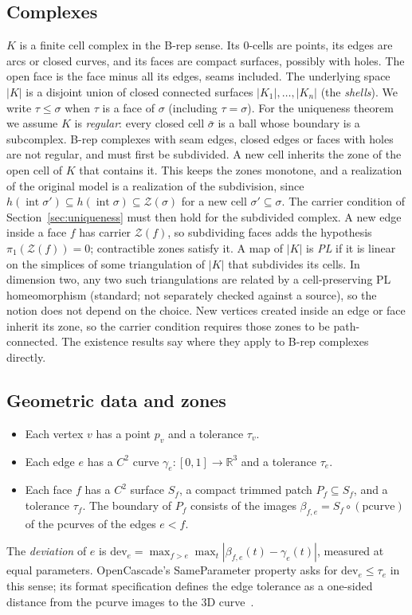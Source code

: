 \documentclass[preprint,12pt]{elsarticle}
\theoremstyle{definition}
\theoremstyle{remark}
\newcommand{\R}{\mathbb{R}}
\newcommand{\Z}{\mathcal{Z}}
\newcommand{\inter}{\operatorname{int}}
\begin{document}
\subsection{Complexes}
$K$ is a finite cell complex in the B-rep sense. Its 0-cells are points, its edges are arcs or closed curves, and
its faces are compact surfaces, possibly with holes. The open face is the face minus all its edges, seams included. The underlying space $|K|$ is a
disjoint union of closed connected surfaces $|K_1|,\dots,|K_n|$ (the \emph{shells}). We write $\tau\le\sigma$ when $\tau$ is a face of $\sigma$ (including
$\tau=\sigma$). For the uniqueness theorem we assume $K$ is \emph{regular}: every closed cell $\bar\sigma$ is a
ball whose boundary is a subcomplex. B-rep complexes with seam edges, closed edges or faces with holes are not
regular, and must first be subdivided. A new cell inherits the zone of the open cell of $K$ that contains it.
This keeps the zones monotone, and a realization of the original model is a realization of the subdivision, since
$h(\inter\sigma')\subseteq h(\inter\sigma)\subseteq\Z(\sigma)$ for a new cell $\sigma'\subseteq\sigma$. The carrier
condition of Section~\ref{sec:uniqueness} must then hold for the subdivided complex. A new edge inside a face $f$
has carrier $\Z(f)$, so subdividing faces adds the hypothesis $\pi_1(\Z(f))=0$; contractible zones satisfy it. A map of $|K|$ is \emph{PL} if it is linear on the simplices of some triangulation of $|K|$ that subdivides its
cells. In dimension two, any two such triangulations are related by a cell-preserving PL homeomorphism (standard; not
separately checked against a source), so the notion does not depend on the choice. New vertices created inside an edge or face inherit its zone, so the carrier condition requires those
zones to be path-connected. The existence results say where they apply to B-rep
complexes directly.

\subsection{Geometric data and zones}
\begin{itemize}
\item Each vertex $v$ has a point $p_v$ and a tolerance $\tau_v$.
\item Each edge $e$ has a $C^2$ curve $\gamma_e\colon[0,1]\to\R^3$ and a tolerance $\tau_e$.
\item Each face $f$ has a $C^2$ surface $S_f$, a compact trimmed patch $P_f\subseteq S_f$, and a tolerance
$\tau_f$. The boundary of $P_f$ consists of the images $\beta_{f,e}=S_f\circ(\text{pcurve})$ of the pcurves of the
edges $e<f$.
\end{itemize}
The \emph{deviation} of $e$ is $\mathrm{dev}_e=\max_{f>e}\max_t|\beta_{f,e}(t)-\gamma_e(t)|$, measured at equal
parameters. OpenCascade's SameParameter property asks for $\mathrm{dev}_e\le\tau_e$ in this sense; its format
specification defines the edge tolerance as a one-sided distance from the pcurve images to the 3D
curve~\cite{OCCT}.
\end{document}
